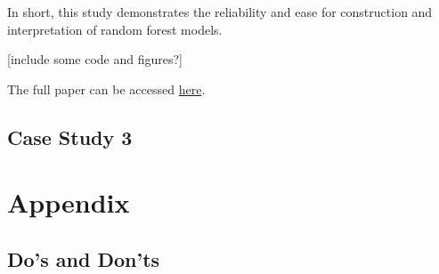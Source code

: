 \documentclass[
]{book}
\begin{document}
In short, this study demonstrates the reliability and ease for construction and interpretation of random forest models.

{[}include some code and figures?{]}

The full paper can be accessed \href{https://www.sciencedirect.com/science/article/pii/S0025326X24000304?via\%3Dihub}{here}.

\hypertarget{case-study-3}{%
\section{Case Study 3}\label{case-study-3}}

\hypertarget{appendix}{%
\chapter{Appendix}\label{appendix}}

\hypertarget{dos-and-donts}{%
\section{Do's and Don'ts}\label{dos-and-donts}}

  
\end{document}
